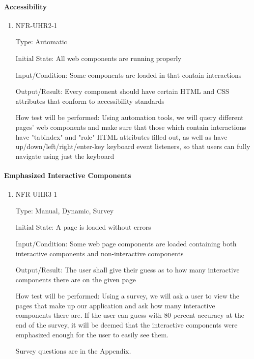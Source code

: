 \documentclass[12pt, titlepage]{article}
\begin{document}
\paragraph{Accessibility}

\begin{enumerate}

\item{NFR-UHR2-1\\}

Type: Automatic
					
Initial State: All web components are running properly
					
Input/Condition: Some components are loaded in that contain interactions
					
Output/Result: Every component should have certain HTML and CSS attributes that conform to accessibility standards
					
How test will be performed: Using automation tools, we will query different pages' web components and make sure that those which contain interactions have "tabindex" and "role" HTML attributes filled out, as well as have up/down/left/right/enter-key keyboard event listeners, so that users can fully navigate using just the keyboard

\end{enumerate}

\paragraph{Emphasized Interactive Components}

\begin{enumerate}

\item{NFR-UHR3-1\\}

Type: Manual, Dynamic, Survey
					
Initial State: A page is loaded without errors
					
Input/Condition: Some web page components are loaded containing both interactive components and non-interactive components
					
Output/Result: The user shall give their guess as to how many interactive components there are on the given page
					
How test will be performed: Using a survey, we will ask a user to view the pages that make up our application and ask how many interactive components there are. If the user can guess with 80 percent accuracy at the end of the survey, it will be deemed that the interactive components were emphasized enough for the user to easily see them.

Survey questions are in the Appendix.

\end{enumerate}
\end{document}
